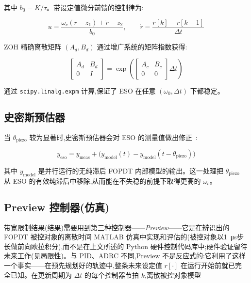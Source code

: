 \documentclass[fleqn,10pt]{wlscirep}
\begin{document}
其中 $b_0 = K/\tau$。带设定值微分前馈的控制律为:

\begin{equation}
u = \frac{\omega_c(r - z_1) + \dot{r} - z_2}{b_0}, \qquad \dot{r} = \frac{r[k]-r[k-1]}{\Delta t}
\end{equation}

ZOH 精确离散矩阵 $(A_d, B_d)$ 通过增广系统的矩阵指数获得:

\begin{equation}
\begin{bmatrix}A_d & B_d \\ 0 & I\end{bmatrix}
= \exp\!\left(\begin{bmatrix}A_c & B_c \\ 0 & 0\end{bmatrix}\Delta t\right)
\end{equation}

通过 \texttt{scipy.linalg.expm} 计算,保证了 ESO 在任意 $(\omega_0, \Delta t)$ 下都稳定。

\subsection*{史密斯预估器}

当 $\theta_\text{piezo}$ 较为显著时,史密斯预估器会对 ESO 的测量值做出修正~\cite{smith1957smith}:

\begin{equation}
y_\text{eso} = y_\text{meas} + \bigl(y_\text{model}(t) - y_\text{model}(t-\theta_\text{piezo})\bigr)
\end{equation}

其中 $y_\text{model}$ 是并行运行的无纯滞后 FOPDT 内部模型的输出。这一处理把 $\theta_\text{piezo}$ 从 ESO 的有效纯滞后中移除,从而能在不失稳的前提下取得更高的 $\omega_c$。

\subsection*{Preview 控制器(仿真)}

带宽限制结果(结果)需要用到第三种控制器——\emph{Preview}——它是在辨识出的 FOPDT 被控对象的离散时间 MATLAB 仿真中实现和评估的(被控对象以\SI{1}{\micro s}步长做前向欧拉积分),而不是在上文所述的 Python 硬件控制代码库中;硬件验证留待未来工作(见局限性)。与 PID、ADRC 不同,Preview 不是反应式的:它利用了这样一个事实——在预先规划好的轨迹中,整条未来设定值 $r[\cdot]$ 在运行开始前就已完全已知。在更新周期为 $\Delta t$ 的每个控制器节拍 $k$,离散被控对象模型
\end{document}
